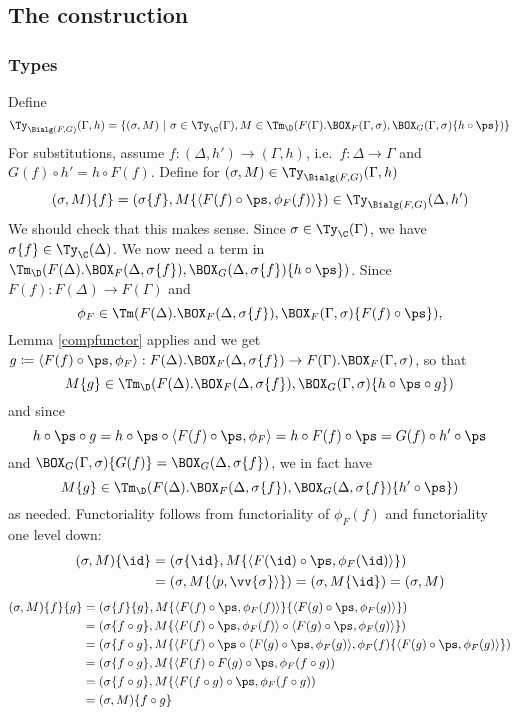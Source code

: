 \documentclass{article}
\newcommand{\isoFL}{\ensuremath{\phi_{F}}} %
\begin{document}
\subsection{The construction}

\subsubsection{Types}

Define
\[
\Ty_{\Bialg(F, G)}(\Gamma, h) = \{ (\sigma, M)\ |\ \sigma \in \Ty_{\C}(\Gamma),
 M \in \Tm_\D(F(\Gamma).\BOX_F(\Gamma, \sigma),\BOX_G(\Gamma, \sigma)\{h \circ \ps\})\}
\]
For substitutions, assume $f : (\Delta, h') \to (\Gamma, h)$, i.e.\ $f
: \Delta \to \Gamma$ and $G(f) \circ h' = h \circ F(f)$. Define for $(\sigma, M) \in \Ty_{\Bialg(F, G)}(\Gamma, h)$
\[
(\sigma, M)\{f\} = (\sigma\{f\}, M\{\langle F(f) \circ \ps, \isoFL(f)\rangle\}) \in \Ty_{\Bialg(F, G)}(\Delta, h')
\]
%
We should check that this makes sense. Since $\sigma \in
\Ty_{\C}(\Gamma)$, we have $\sigma\{f\} \in \Ty_{\C}(\Delta)$. We now
need a term in $\Tm_\D(F(\Delta).\BOX_F(\Delta,
\sigma\{f\}),\BOX_G(\Delta, \sigma\{f\})\{h \circ \ps\})$.  Since
$F(f) : F(\Delta) \to F(\Gamma)$ and
\[
\isoFL \in \Tm(F(\Delta).\BOX_F(\Delta, \sigma\{f\}),
\BOX_F(\Gamma, \sigma)\{F(f) \circ \ps\}),
\]
Lemma \ref{compfunctor} applies and we get $g \coloneqq \langle F(f) \circ \ps,
\isoFL\rangle : F(\Delta).\BOX_F(\Delta, \sigma\{f\}) \to
F(\Gamma).\BOX_F(\Gamma, \sigma)$, so that
\[
M\{g\} \in
\Tm_\D(F(\Delta).\BOX_F(\Delta, \sigma\{f\}),\BOX_G(\Gamma,
\sigma)\{h \circ \ps \circ g\})
\]
and since
\[
h \circ \ps \circ g = h \circ \ps \circ \langle F(f) \circ \ps,
\isoFL\rangle = h \circ F(f) \circ \ps = G(f) \circ h' \circ \ps
\]
and $\BOX_G(\Gamma, \sigma)\{G(f)\} = \BOX_G(\Delta,
\sigma\{f\})$, we in fact have
\[
M\{g\} \in \Tm_\D(F(\Delta).\BOX_F(\Delta,
\sigma\{f\}),\BOX_G(\Delta, \sigma\{f\})\{h' \circ \ps\})
\]
as needed.
Functoriality follows from functoriality of $\isoFL(f)$ and functoriality one level down:
\begin{align*}
(\sigma, M)\{\id\} &= (\sigma\{\id\}, M\{\langle F(\id) \circ \ps, \isoFL(\id)\rangle\}) \\ &=
  (\sigma, M\{\langle p, \vv{\sigma}\rangle\}) = (\sigma, M\{\id\}) = (\sigma, M)
\end{align*}
\begin{align*}
  (\sigma, M)\{f\}\{g\} 
  &= (\sigma\{f\}\{g\}, M\{\langle F(f) \circ \ps, \isoFL(f)\rangle\}\{\langle F(g) \circ \ps, \isoFL(g)\rangle\}) \\
  &= (\sigma\{f \circ g\}, M\{\langle F(f) \circ \ps, \isoFL(f)\rangle \circ \langle F(g) \circ \ps, \isoFL(g)\rangle\}) \\
  &= (\sigma\{f \circ g\}, M\{\langle F(f) \circ \ps \circ \langle F(g) \circ \ps, \isoFL(g)\rangle, \isoFL(f)\{\langle F(g) \circ \ps, \isoFL(g)\rangle\}) \\
  &= (\sigma\{f \circ g\}, M\{\langle F(f) \circ F(g) \circ \ps, \isoFL(f \circ g)) \\
  &= (\sigma\{f \circ g\}, M\{\langle F(f \circ g) \circ \ps, \isoFL(f \circ g)) \\
  &= (\sigma, M)\{f \circ g\}
\end{align*}
\end{document}
